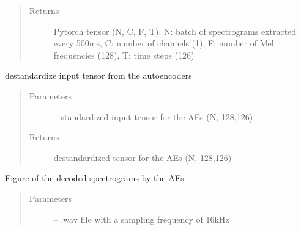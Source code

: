 \documentclass[letterpaper,10pt,english]{sphinxmanual}
\begin{document}
\begin{fulllineitems}
\begin{fulllineitems}
\begin{quote}
\begin{description}
\item[{Returns}] \leavevmode
Pytorch tensor (N, C, F, T). N: batch of spectrograms extracted every 500ms, C: number of channels (1),  F: number of Mel frequencies (128), T: time steps (126)

\end{description}\end{quote}

\end{fulllineitems}


\begin{fulllineitems}
\label{\detokenize{RepLearning:AEspeech.AEspeech.destandard}}
destandardize input tensor from the autoencoders
\begin{quote}\begin{description}
\item[{Parameters}] \leavevmode
{} -- standardized input tensor for the AEs (N, 128,126)

\item[{Returns}] \leavevmode
destandardized tensor for the AEs (N, 128,126)

\end{description}\end{quote}

\end{fulllineitems}


\begin{fulllineitems}
\label{\detokenize{RepLearning:AEspeech.AEspeech.plot_spectrograms}}
Figure of the decoded spectrograms by the AEs
\begin{quote}\begin{description}
\item[{Parameters}] \leavevmode
{} -- .wav file with a sampling frequency of 16kHz

\end{description}\end{quote}

\end{fulllineitems}



\end{fulllineitems}
\end{document}
